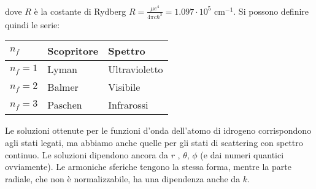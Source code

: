 dove $R$ è la costante di Rydberg $R=\frac{\mu e^4}{4\pi c\hbar ^3}=1.097\cdot 10^5$ cm$^{-1}$.
\newline
\newline
Si possono definire quindi le serie: \\
\newline
\newline
\begin{tabularx}{\textwidth}{XXX}
\toprule
$n_f$ & Scopritore & Spettro \\
\midrule
$n_f=1$ & Lyman & Ultravioletto \\
$n_f=2$ & Balmer & Visibile \\
$n_f=3$ & Paschen & Infrarossi \\
\bottomrule
\end{tabularx}

Le soluzioni ottenute per le funzioni d'onda dell'atomo di idrogeno corrispondono agli stati legati, ma abbiamo anche quelle per gli stati di scattering con spettro continuo. Le soluzioni dipendono ancora da $r$ , $\theta$, $\phi$ (e dai numeri quantici ovviamente). Le armoniche sferiche tengono la stessa forma, mentre la parte radiale, che non è normalizzabile, ha una dipendenza anche da $k$.

% 